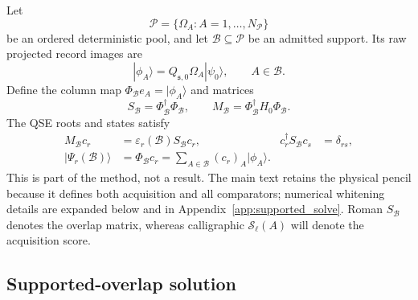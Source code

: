 \documentclass[
  reprint,
  amsmath,
  amssymb,
  aps,
  pra,
  nofootinbib,
  superscriptaddress,
  floatfix
]{revtex4-2}
\newcommand{\ket}[1]{|#1\rangle}
\newcommand{\score}{\mathcal{S}}
\begin{document}
Let
\begin{equation}
 \mathcal P=\{\Omega_A:A=1,\ldots,N_{\mathcal P}\}
 \label{eq:declared_pool}
\end{equation}
be an ordered deterministic pool, and let $\mathcal B\subseteq\mathcal P$ be
an admitted support.  Its raw projected record images are
\begin{equation}
 \ket{\phi_A}=Q_{\mathfrak s,0}\Omega_A\ket{\psi_0},
 \qquad A\in\mathcal B.
 \label{eq:record_image}
\end{equation}
Define the column map $\Phi_{\mathcal B}e_A=\ket{\phi_A}$ and matrices
\begin{equation}
 S_{\mathcal B}=\Phi_{\mathcal B}^{\dagger}\Phi_{\mathcal B},
 \qquad
 M_{\mathcal B}=\Phi_{\mathcal B}^{\dagger}H_0\Phi_{\mathcal B}.
 \label{eq:qse_matrices}
\end{equation}
The QSE roots and states satisfy
\begin{align}
 M_{\mathcal B}c_r
 &=\varepsilon_r(\mathcal B)S_{\mathcal B}c_r,
 &c_r^{\dagger}S_{\mathcal B}c_s&=\delta_{rs},
 \label{eq:qse_gep}\\
 \ket{\Psi_r(\mathcal B)}
 &=\Phi_{\mathcal B}c_r
 =\sum_{A\in\mathcal B}(c_r)_A\ket{\phi_A}.
 \label{eq:qse_ritz_state}
\end{align}
This is part of the method, not a result.  The main text retains the physical
pencil because it defines both acquisition and all comparators; numerical
whitening details are expanded below and in Appendix~\ref{app:supported_solve}.
Roman $S_{\mathcal B}$ denotes the overlap matrix, whereas calligraphic
$\score_\ell(A)$ will denote the acquisition score.

\subsection{Supported-overlap solution}
\label{sec:supported_overlap}
\end{document}
